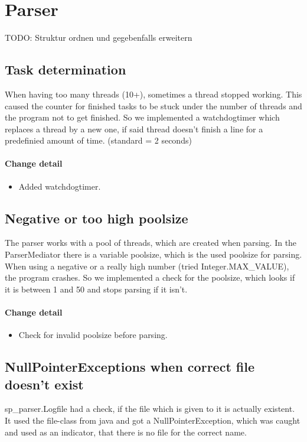 \section{Parser}

TODO: Struktur ordnen und gegebenfalls erweitern
\subsection{Task determination} 
When having too many threads (10+), sometimes a thread stopped working. This caused the counter for finished tasks
to be stuck under the number of threads and the program not to get finished.
So we implemented a watchdogtimer which replaces a thread by a new one, if said thread doesn't finish a line for a 
predefinied amount of time. (standard = 2 seconds)


\paragraph{Change detail}
\begin{itemize}
  \item Added watchdogtimer.
\end{itemize}

\subsection{Negative or too high poolsize}
The parser works with a pool of threads, which are created when parsing. In the ParserMediator there is
a variable poolsize, which is the used poolsize for parsing.
When using a negative or a really high number (tried Integer.MAX\_VALUE), the program crashes. 
So we implemented a check for the poolsize, which looks if it is between 1 and 50 and stops parsing if it isn't.


\paragraph{Change detail}
\begin{itemize}
  \item Check for invalid poolsize before parsing.
\end{itemize}

\subsection{NullPointerExceptions when correct file doesn't exist}
sp\_parser.Logfile had a check, if the file which is given to it is actually existent. It used the file-class from java
and got a NullPointerException, which was caught and used as an indicator, that there is no file for the correct name.


